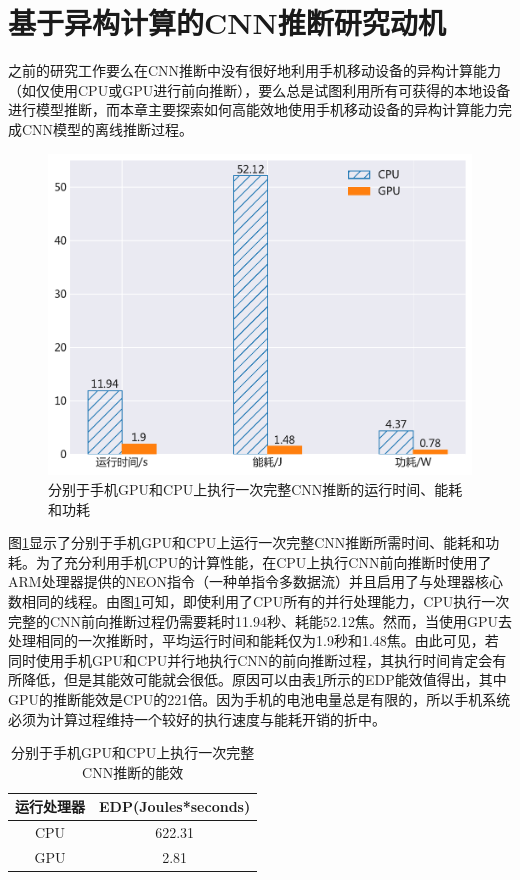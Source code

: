\section{基于异构计算的CNN推断研究动机}
\label{chapter:chapter4-2}
之前的研究工作要么在CNN推断中没有很好地利用手机移动设备的异构计算能力（如仅使用CPU或GPU进行前向推断），要么总是试图利用所有可获得的本地设备进行模型推断，而本章主要探索如何高能效地使用手机移动设备的异构计算能力完成CNN模型的离线推断过程。

\begin{figure}[htbp]
    \centering
    \includegraphics[height=0.4\textwidth]{figures/yolo_energy.pdf}
    \caption{分别于手机GPU和CPU上执行一次完整CNN推断的运行时间、能耗和功耗}\label{figure:figure28}
\end{figure}

图\ref{figure:figure28}显示了分别于手机GPU和CPU上运行一次完整CNN推断所需时间、能耗和功耗。为了充分利用手机CPU的计算性能，在CPU上执行CNN前向推断时使用了ARM处理器提供的NEON指令（一种单指令多数据流）并且启用了与处理器核心数相同的线程。由图\ref{figure:figure28}可知，即使利用了CPU所有的并行处理能力，CPU执行一次完整的CNN前向推断过程仍需要耗时11.94秒、耗能52.12焦。然而，当使用GPU去处理相同的一次推断时，平均运行时间和能耗仅为1.9秒和1.48焦。由此可见，若同时使用手机GPU和CPU并行地执行CNN的前向推断过程，其执行时间肯定会有所降低，但是其能效可能就会很低。原因可以由表\ref{table:table9}所示的EDP能效值得出，其中GPU的推断能效是CPU的221倍。因为手机的电池电量总是有限的，所以手机系统必须为计算过程维持一个较好的执行速度与能耗开销的折中。

\begin{table}[htbp]
  \centering
  \caption{分别于手机GPU和CPU上执行一次完整CNN推断的能效}
  \label{table:table9}
  \begin{tabular}{cc}
    \toprule
      运行处理器 & EDP(Joules*seconds) \\
    \midrule
      CPU & 622.31 \\
      GPU & 2.81 \\
    \bottomrule
  \end{tabular}
\end{table}


